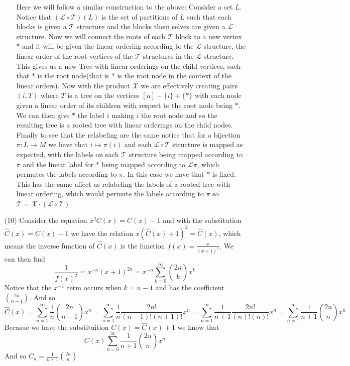 \documentclass[12pt]{amsart}
\theoremstyle{definition}
\newcommand{\ra}{\rightarrow}
\begin{document}
\begin{itemize}
\begin{enumerate}[label=(\alph*)]
    Here we will follow a similar construction to the above: Consider a set $L$. Notice that $(\mathcal{L}\circ\mathcal{T})(L)$ is the set of partitions of $L$ such that each blocks is given a $\mathcal{T}$ structure and the blocks them selves are given a $\mathcal{L}$ structure. Now we will connect the roots of each $\mathcal{T}$ block to a new vertex $*$ and it will be given the linear ordering according to the $\mathcal{L}$ structure, the linear order of the root vertices of the $\mathcal{T}$ structures in the $\mathcal{L}$ structure. This gives us a new Tree with linear orderings on the child vertices, such that $*$ is the root node(that is $*$ is the root node in the context of the linear orders). Now with the product $\mathcal{X}$ we are effectively creating pairs $(i, T)$ where $T$ is a tree on the vertices $[n]-\{i\}+\{*\}$ with each node given a linear order of its children with respect to the root node being $*$. We can then give $*$ the label $i$ making $i$ the root node and so the resulting tree is a rooted tree with linear orderings on the child nodes. Finally to see that the relabeling are the same notice that for a bijection $\pi:L\ra M$ we have that $i\mapsto \pi(i)$ and each $\mathcal{L}\circ\mathcal{T}$ structure is mapped as expected, with the labels on each $\mathcal{T}$ structure being mapped according to $\pi$ and the linear label for $*$ being mapped according to $\mathcal{L}\pi$, which permutes the labels according to $\pi$. In this case we have that $*$ is fixed. This has the same affect as relabeling the labels of a rooted tree with linear ordering, which would permute the labels according to $\pi$ so $\mathcal{T}=\mathcal{X}\cdot (\mathcal{L}\circ \mathcal{T})$.\\

    
\end{enumerate}
    
    \item[(10)] %
    Consider the equation $x^2C(x)=C(x)-1$ and with the substitution $\hat{C}(x)=C(x)-1$ we have the relation $x(\hat{C}(x)+1)^2=\hat{C}(x)$, which means the inverse function of $\hat{C}(x)$ is the function $f(x)=\frac{x}{(x+1)^2}$. We can then find 
    $$\frac{1}{f(x)^2}=x^{-n}(x+1)^{2n}=x^{-n}\sum_{k=0}^\infty {2n\choose k}x^k$$
    Notice that the $x^{-1}$ term occurs when $k=n-1$ and has the coefficient ${2n\choose n-1}$. And so $$\hat{C}(x)=\sum_{n=1}^\infty \frac{1}{n}{2n\choose n-1}x^n=\sum_{n=1}^\infty \frac{1}{n}\frac{2n!}{(n-1)!(n+1)!}x^n=\sum_{n=1}^\infty \frac{1}{n+1}\frac{2n!}{(n)!(n)!}x^n=\sum_{n=1}^\infty \frac{1}{n+1}{2n\choose n}x^n$$
    Becasue we have the substituition $C(x)=\hat{C}(x)+1$ we know that $$C(x)\sum_{n=0}^\infty \frac{1}{n+1}{2n\choose n}x^n$$
    And so $\displaystyle{C_n=\frac{1}{n+1}{2n\choose n}}$


\end{itemize}
\end{document}
